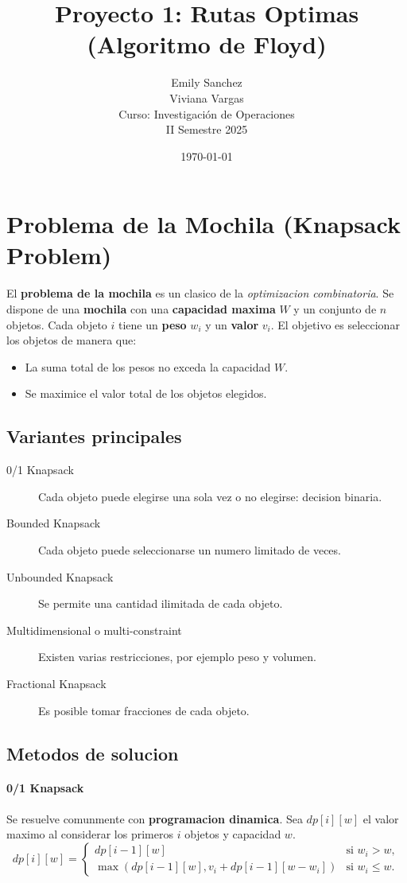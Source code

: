 \documentclass{article}
\title{Proyecto 1: Rutas Optimas (Algoritmo de Floyd)}
\author{Emily Sanchez \\ Viviana Vargas \\[1cm] Curso: Investigación de Operaciones \\ II Semestre 2025}
\date{\today}
\begin{document}
\maketitle

\thispagestyle{empty}
\newpage
\setcounter{page}{1}

\section{Problema de la Mochila (Knapsack Problem)}

El \textbf{problema de la mochila} es un clasico de la \textit{optimizacion combinatoria}. Se dispone de una \textbf{mochila} con una \textbf{capacidad maxima} $W$ y un conjunto de $n$ objetos. Cada objeto $i$ tiene un \textbf{peso} $w_i$ y un \textbf{valor} $v_i$. El objetivo es seleccionar los objetos de manera que:
\begin{itemize}
  \item La suma total de los pesos no exceda la capacidad $W$.
  \item Se maximice el valor total de los objetos elegidos.
\end{itemize}

\subsection{Variantes principales}
\begin{description}
  \item[0/1 Knapsack] Cada objeto puede elegirse una sola vez o no elegirse: decision binaria.
  \item[Bounded Knapsack] Cada objeto puede seleccionarse un numero limitado de veces.
  \item[Unbounded Knapsack] Se permite una cantidad ilimitada de cada objeto.
  \item[Multidimensional o multi-constraint] Existen varias restricciones, por ejemplo peso y volumen.
  \item[Fractional Knapsack] Es posible tomar fracciones de cada objeto.
\end{description}

\subsection{Metodos de solucion}
\paragraph{0/1 Knapsack} Se resuelve comunmente con \textbf{programacion dinamica}. Sea $dp[i][w]$ el valor maximo al considerar los primeros $i$ objetos y capacidad $w$.
\[
dp[i][w] =
\begin{cases}
dp[i-1][w] & \text{si } w_i > w, \\
\max ( dp[i-1][w], v_i + dp[i-1][w - w_i] ) & \text{si } w_i \le w.
\end{cases}
\]
\end{document}
